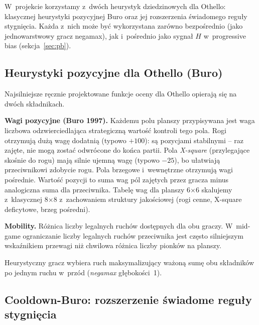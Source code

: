 \documentclass[11pt,a4paper]{article}
\begin{document}
W~projekcie korzystamy z~dwóch heurystyk dziedzinowych dla Othello: klasycznej heurystyki pozycyjnej Buro oraz jej rozszerzenia świadomego reguły stygnięcia. Każda z~nich może być wykorzystana zarówno bezpośrednio (jako jednowarstwowy gracz negamax), jak i~pośrednio jako sygnał $H$ w~progressive bias (sekcja~\ref{sec:pb}).

\subsection{Heurystyki pozycyjne dla Othello (Buro)}\label{sec:buro}

Najsilniejsze ręcznie projektowane funkcje oceny dla Othello \cite{buro1997evaluation,buro2003evolution} opierają się na dwóch składnikach.

\textbf{Wagi pozycyjne (Buro 1997).} Każdemu polu planszy przypisywana jest waga liczbowa odzwierciedlająca strategiczną wartość kontroli tego pola. Rogi otrzymują dużą wagę dodatnią (typowo $+100$): są pozycjami stabilnymi -- raz zajęte, nie mogą zostać odwrócone do końca partii. Pola \emph{X-square} (przylegające skośnie do rogu) mają silnie ujemną wagę (typowo $-25$), bo ułatwiają przeciwnikowi zdobycie rogu. Pola brzegowe i~wewnętrzne otrzymują wagi pośrednie. Wartość pozycji to suma wag pól zajętych przez gracza minus analogiczna suma dla przeciwnika. Tabelę wag dla planszy 6$\times$6 skalujemy z~klasycznej 8$\times$8 z~zachowaniem struktury jakościowej (rogi cenne, X-square deficytowe, brzeg pośredni).

\textbf{Mobility.} Różnica liczby legalnych ruchów dostępnych dla obu graczy. W~mid-game ograniczanie liczby legalnych ruchów przeciwnika jest często silniejszym wskaźnikiem przewagi niż chwilowa różnica liczby pionków na planszy.

Heurystyczny gracz wybiera ruch maksymalizujący ważoną sumę obu składników po jednym ruchu w~przód (\emph{negamax} głębokości~1).

\subsection{Cooldown-Buro: rozszerzenie świadome reguły stygnięcia}\label{sec:cooldown-buro}
\end{document}
